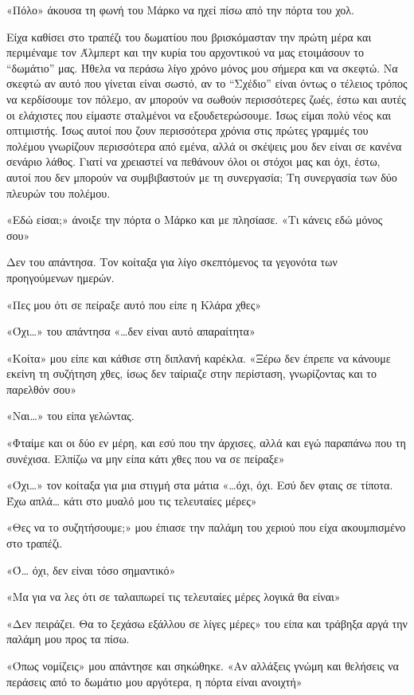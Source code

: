 \documentclass[12pt,twoside, openany]{book}
\begin{document}
«Πόλο» άκουσα τη φωνή του Μάρκο να ηχεί πίσω από την πόρτα του χολ.

Είχα καθίσει στο τραπέζι του δωματίου που βρισκόμασταν την πρώτη μέρα και περιμέναμε τον Άλμπερτ και την κυρία του αρχοντικού να μας ετοιμάσουν το “δωμάτιο” μας. Ήθελα να περάσω λίγο χρόνο μόνος μου σήμερα και να σκεφτώ. Να σκεφτώ αν αυτό που γίνεται είναι σωστό, αν το “Σχέδιο” είναι όντως ο τέλειος τρόπος να κερδίσουμε τον πόλεμο, αν μπορούν να σωθούν περισσότερες ζωές, έστω και αυτές οι ελάχιστες που είμαστε σταλμένοι να εξουδετερώσουμε. Ίσως είμαι πολύ νέος και οπτιμιστής. Ίσως αυτοί που ζουν περισσότερα χρόνια στις πρώτες γραμμές του πολέμου γνωρίζουν περισσότερα από εμένα, αλλά οι σκέψεις μου δεν είναι σε κανένα σενάριο λάθος. Γιατί να χρειαστεί να πεθάνουν όλοι οι στόχοι μας και όχι, έστω, αυτοί που δεν μπορούν να συμβιβαστούν με τη συνεργασία; Τη συνεργασία των δύο πλευρών του πολέμου.

«Εδώ είσαι;» άνοιξε την πόρτα ο Μάρκο και με πλησίασε. «Τι κάνεις εδώ μόνος σου»

Δεν του απάντησα. Τον κοίταξα για λίγο σκεπτόμενος τα γεγονότα των προηγούμενων ημερών.

«Πες μου ότι σε πείραξε αυτό που είπε η Κλάρα χθες»

«Όχι…» του απάντησα «…δεν είναι αυτό απαραίτητα»

«Κοίτα» μου είπε και κάθισε στη διπλανή καρέκλα. «Ξέρω δεν έπρεπε να κάνουμε εκείνη τη συζήτηση χθες, ίσως δεν ταίριαζε στην περίσταση, γνωρίζοντας και το παρελθόν σου»

«Ναι…» του είπα γελώντας.

«Φταίμε και οι δύο εν μέρη, και εσύ που την άρχισες, αλλά και εγώ παραπάνω που τη συνέχισα. Ελπίζω να μην είπα κάτι χθες που να σε πείραξε»

«Όχι…» τον κοίταξα για μια στιγμή στα μάτια «…όχι, όχι. Εσύ δεν φταις σε τίποτα. Έχω απλά… κάτι στο μυαλό μου τις τελευταίες μέρες»

«Θες να το συζητήσουμε;» μου έπιασε την παλάμη του χεριού που είχα ακουμπισμένο στο τραπέζι.

«Ό… όχι, δεν είναι τόσο σημαντικό»

«Μα για να λες ότι σε ταλαιπωρεί τις τελευταίες μέρες λογικά θα είναι»

«Δεν πειράζει. Θα το ξεχάσω εξάλλου σε λίγες μέρες» του είπα και τράβηξα αργά την παλάμη μου προς τα πίσω.

«Όπως νομίζεις» μου απάντησε και σηκώθηκε. «Αν αλλάξεις γνώμη και θελήσεις να περάσεις από το δωμάτιο μου αργότερα, η πόρτα είναι ανοιχτή»
\end{document}
